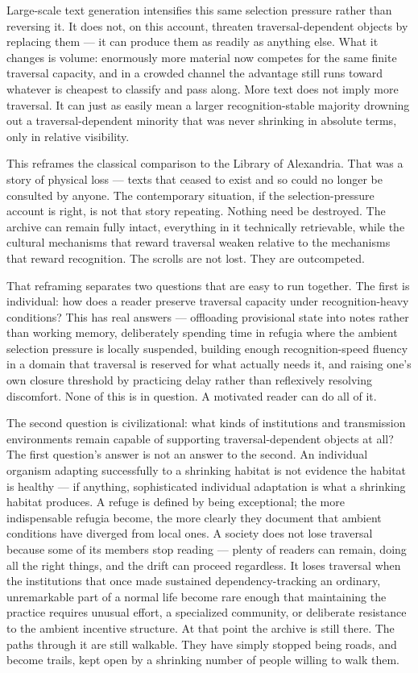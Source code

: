 \documentclass[11pt]{article}
\begin{document}
Large-scale text generation intensifies this same selection pressure rather than reversing it. It does not, on this account, threaten traversal-dependent objects by replacing them --- it can produce them as readily as anything else. What it changes is volume: enormously more material now competes for the same finite traversal capacity, and in a crowded channel the advantage still runs toward whatever is cheapest to classify and pass along. More text does not imply more traversal. It can just as easily mean a larger recognition-stable majority drowning out a traversal-dependent minority that was never shrinking in absolute terms, only in relative visibility.

This reframes the classical comparison to the Library of Alexandria. That was a story of physical loss --- texts that ceased to exist and so could no longer be consulted by anyone. The contemporary situation, if the selection-pressure account is right, is not that story repeating. Nothing need be destroyed. The archive can remain fully intact, everything in it technically retrievable, while the cultural mechanisms that reward traversal weaken relative to the mechanisms that reward recognition. The scrolls are not lost. They are outcompeted.

That reframing separates two questions that are easy to run together. The first is individual: how does a reader preserve traversal capacity under recognition-heavy conditions? This has real answers --- offloading provisional state into notes rather than working memory, deliberately spending time in refugia where the ambient selection pressure is locally suspended, building enough recognition-speed fluency in a domain that traversal is reserved for what actually needs it, and raising one's own closure threshold by practicing delay rather than reflexively resolving discomfort. None of this is in question. A motivated reader can do all of it.

The second question is civilizational: what kinds of institutions and transmission environments remain capable of supporting traversal-dependent objects at all? The first question's answer is not an answer to the second. An individual organism adapting successfully to a shrinking habitat is not evidence the habitat is healthy --- if anything, sophisticated individual adaptation is what a shrinking habitat produces. A refuge is defined by being exceptional; the more indispensable refugia become, the more clearly they document that ambient conditions have diverged from local ones. A society does not lose traversal because some of its members stop reading --- plenty of readers can remain, doing all the right things, and the drift can proceed regardless. It loses traversal when the institutions that once made sustained dependency-tracking an ordinary, unremarkable part of a normal life become rare enough that maintaining the practice requires unusual effort, a specialized community, or deliberate resistance to the ambient incentive structure. At that point the archive is still there. The paths through it are still walkable. They have simply stopped being roads, and become trails, kept open by a shrinking number of people willing to walk them.
\end{document}
